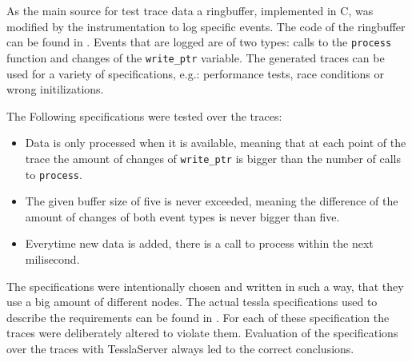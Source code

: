 
As the main source for test trace data a ringbuffer, implemented in C, was modified by the instrumentation to log specific events.
The code of the ringbuffer can be found in .
Events that are logged are of two types: calls to the \lstinline{process} function and changes of the \lstinline{write_ptr} variable.
The generated traces can be used for a variety of specifications, e.g.: performance tests, race conditions or wrong initilizations.

The Following specifications were tested over the traces:

\begin{itemize}
  \item Data is only processed when it is available, meaning that at each point of the trace the amount of changes of \lstinline{write_ptr} is bigger than the number of calls to \lstinline{process}.
  \item The given buffer size of five is never exceeded, meaning the difference of the amount of changes of both event types is never bigger than five.
  \item Everytime new data is added, there is a call to process within the next milisecond.
\end{itemize}

The specifications were intentionally chosen and written in such a way, that they use a big amount of different nodes.
The actual \gls{tessla} specifications used to describe the requirements can be found in .
For each of these specification the traces were deliberately altered to violate them.
Evaluation of the specifications over the traces with TesslaServer always led to the correct conclusions.
